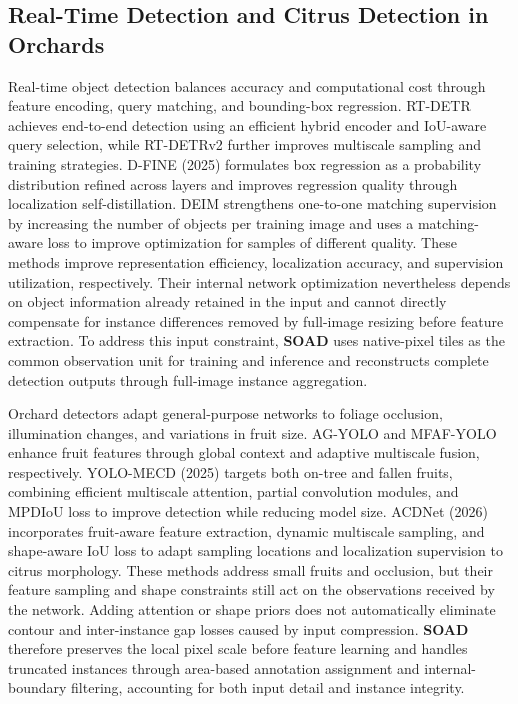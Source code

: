\documentclass[11pt,a4paper]{article}
\begin{document}
\subsection{Real-Time Detection and Citrus Detection in Orchards}
Real-time object detection balances accuracy and computational cost through feature encoding, query matching, and bounding-box regression. RT-DETR \cite{rtdetr} achieves end-to-end detection using an efficient hybrid encoder and IoU-aware query selection, while RT-DETRv2 \cite{rtdetrv2} further improves multiscale sampling and training strategies. D-FINE (2025) \cite{dfine} formulates box regression as a probability distribution refined across layers and improves regression quality through localization self-distillation. DEIM \cite{deim} strengthens one-to-one matching supervision by increasing the number of objects per training image and uses a matching-aware loss to improve optimization for samples of different quality. These methods improve representation efficiency, localization accuracy, and supervision utilization, respectively. Their internal network optimization nevertheless depends on object information already retained in the input and cannot directly compensate for instance differences removed by full-image resizing before feature extraction. To address this input constraint, \textbf{SOAD} uses native-pixel tiles as the common observation unit for training and inference and reconstructs complete detection outputs through full-image instance aggregation.

Orchard detectors adapt general-purpose networks to foliage occlusion, illumination changes, and variations in fruit size. AG-YOLO \cite{agyolo} and MFAF-YOLO \cite{mfaf} enhance fruit features through global context and adaptive multiscale fusion, respectively. YOLO-MECD (2025) \cite{mecd} targets both on-tree and fallen fruits, combining efficient multiscale attention, partial convolution modules, and MPDIoU loss to improve detection while reducing model size. ACDNet (2026) \cite{acdnet} incorporates fruit-aware feature extraction, dynamic multiscale sampling, and shape-aware IoU loss to adapt sampling locations and localization supervision to citrus morphology. These methods address small fruits and occlusion, but their feature sampling and shape constraints still act on the observations received by the network. Adding attention or shape priors does not automatically eliminate contour and inter-instance gap losses caused by input compression. \textbf{SOAD} therefore preserves the local pixel scale before feature learning and handles truncated instances through area-based annotation assignment and internal-boundary filtering, accounting for both input detail and instance integrity.
\end{document}
